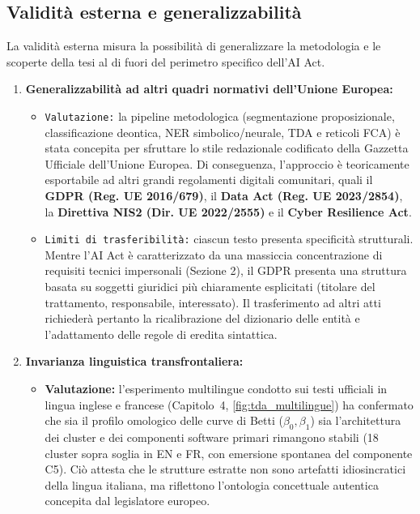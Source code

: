 \documentclass[12pt,a4paper,oneside]{report}
\begin{document}
\subsection{Validità esterna e generalizzabilità}
La validità esterna misura la possibilità di generalizzare la metodologia e le scoperte della tesi al di fuori del perimetro specifico dell'AI Act.
\begin{enumerate}
    \item \textbf{Generalizzabilità ad altri quadri normativi dell'Unione Europea:}
    \begin{itemize}
    \item \texttt{Valutazione:} la pipeline metodologica (segmentazione proposizionale, classificazione deontica, NER simbolico/neurale, TDA e reticoli FCA) è stata concepita per sfruttare lo stile redazionale codificato della Gazzetta Ufficiale dell'Unione Europea. Di conseguenza, l'approccio è teoricamente esportabile ad altri grandi regolamenti digitali comunitari, quali il \textbf{GDPR (Reg. UE \num{2016}/679)}, il \textbf{Data Act (Reg. UE \num{2023}/2854)}, la \textbf{Direttiva NIS2 (Dir. UE \num{2022}/2555)} e il \textbf{Cyber Resilience Act}.
    \item \texttt{Limiti di trasferibilità:} ciascun testo presenta specificità strutturali. Mentre l'AI Act è caratterizzato da una massiccia concentrazione di requisiti tecnici impersonali (Sezione 2), il GDPR presenta una struttura basata su soggetti giuridici più chiaramente esplicitati (titolare del trattamento, responsabile, interessato). Il trasferimento ad altri atti richiederà pertanto la ricalibrazione del dizionario delle entità e l'adattamento delle regole di eredita sintattica.
\end{itemize}
    \item \textbf{Invarianza linguistica transfrontaliera:}
    \begin{itemize}
        \item \textbf{Valutazione:} l'esperimento multilingue condotto sui testi ufficiali in lingua inglese e francese (Capitolo~4, \cref{fig:tda_multilingue}) ha confermato che sia il profilo omologico delle curve di Betti ($\beta_0, \beta_1$) sia l'architettura dei cluster e dei componenti software primari rimangono stabili (18 cluster sopra soglia in EN e FR, con emersione spontanea del componente C5). Ciò attesta che le strutture estratte non sono artefatti idiosincratici della lingua italiana, ma riflettono l'ontologia concettuale autentica concepita dal legislatore europeo.
    \end{itemize}
    
\end{enumerate}
\end{document}
